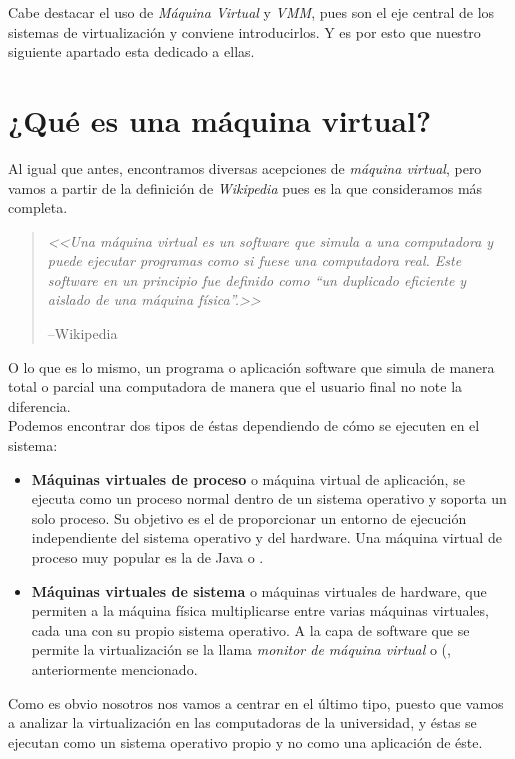 Cabe destacar el uso de  \emph{Máquina Virtual} y \emph{VMM}, pues son el eje central de los sistemas de virtualización y conviene introducirlos. Y es por esto que nuestro siguiente apartado esta dedicado a ellas.

\section{¿Qué es una máquina virtual?}

Al igual que antes, encontramos diversas acepciones de \emph{máquina virtual}, pero vamos a partir de la definición de \emph{Wikipedia} pues es la que consideramos más completa.

\begin{quote}
\emph{<<Una máquina virtual es un software que simula a una computadora y puede ejecutar programas como si fuese una computadora real. Este software en un principio fue definido como \textquotedblleft un duplicado eficiente y aislado de una máquina física\textquotedblright.>>}
\begin{flushright}
--Wikipedia\cite{defmaqvirwiki}
\end{flushright}
\end{quote}

O lo que es lo mismo, un programa o aplicación software que simula de manera total o parcial una computadora de manera que el usuario final no note la diferencia.\\

Podemos encontrar dos tipos de éstas dependiendo de cómo se ejecuten en el sistema:

\begin{itemize}
\item \textbf{Máquinas virtuales de proceso} o máquina virtual de aplicación, se ejecuta como un proceso normal dentro de un sistema operativo y soporta un solo proceso. Su objetivo es el de proporcionar un entorno de ejecución independiente del sistema operativo y del hardware. Una máquina virtual de proceso muy popular es la de Java o .
\item \textbf{Máquinas virtuales de sistema} o máquinas virtuales de hardware, que permiten a la máquina física multiplicarse entre varias máquinas virtuales, cada una con su propio sistema operativo. A la capa de software que se permite la virtualización se la llama \emph{monitor de máquina virtual} o (, anteriormente mencionado.
\end{itemize}

Como es obvio nosotros nos vamos a centrar en el último tipo, puesto que vamos a analizar la virtualización en las computadoras de la universidad, y éstas se ejecutan como un sistema operativo propio y no como una aplicación de éste.

